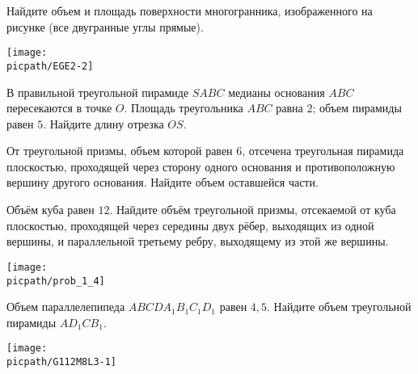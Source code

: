 \begin{class}[number=3]
\begin{listofex}
		\item 
		\begin{minipage}[t]{\bodywidth}
			Найдите объем и площадь поверхности многогранника, изображенного на рисунке (все двугранные углы прямые).
		\end{minipage}
		\hspace{0.02\linewidth}
		\begin{minipage}[t]{\picwidth}
			\texttt{[image: \\picpath/EGE2-2]}
		\end{minipage}
		\item В правильной треугольной пирамиде \(SABC\) медианы основания \(ABC \) пересекаются в точке \(O\). Площадь треугольника \(ABC\) равна \(2\); объем пирамиды равен \(5\). Найдите длину отрезка \(OS\).
		\item От треугольной призмы, объем которой равен \(6\), отсечена треугольная пирамида плоскостью, проходящей через сторону одного основания и противоположную вершину другого основания. Найдите объем оставшейся части.
		\item 
		\begin{minipage}[t]{\bodywidth}
			Объём куба равен \(12\). Найдите объём треугольной призмы, отсекаемой от куба плоскостью, проходящей через середины двух рёбер, выходящих из одной вершины, и параллельной третьему ребру, выходящему из этой же вершины.
		\end{minipage}
		\hspace{0.02\linewidth}
		\begin{minipage}[t]{\picwidth}
			\texttt{[image: \\picpath/prob\_1\_4]}
		\end{minipage}
		\item 
		\begin{minipage}[t]{\bodywidth}
			Объем параллелепипеда \(ABCDA_1B_1C_1D_1\) равен \(4,5\). Найдите объем треугольной пирамиды \(AD_1CB_1\).
		\end{minipage}
		\hspace{0.02\linewidth}
		\begin{minipage}[t]{\picwidth}
			\texttt{[image: \\picpath/G112M8L3-1]}
		\end{minipage}
		

\end{listofex}
\end{class}
